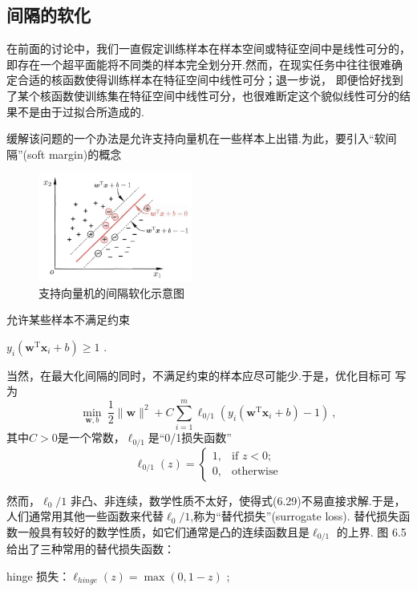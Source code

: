 \documentclass[12pt]{ctexart}
\numberwithin{equation}{section} %
\begin{document}
\subsection{间隔的软化}
在前面的讨论中，我们一直假定训练样本在样本空间或特征空间中是线性可分的，即存在一个超平面能将不同类的样本完全划分开.然而，在现实任务中往往很难确定合适的核函数使得训练样本在特征空间中线性可分；退一步说， 即便恰好找到了某个核函数使训练集在特征空间中线性可分，也很难断定这个貌似线性可分的结果不是由于过拟合所造成的.

缓解该问题的一个办法是允许支持向量机在一些样本上出错.为此，要引入“软间隔”(soft margin)的概念


\begin{figure}[h!] %
  \centering %
  \includegraphics[width=0.45\textwidth]{pi/支持向量机的间隔软化.png} %
  \caption{支持向量机的间隔软化示意图} %
  \label{fig:支持向量机的间隔软化} %
\end{figure}


允许某些样本不满足约束

$y_i( \boldsymbol{w}^\mathrm{T} \boldsymbol{x}_i+ b) \geqslant 1$ .

当然，在最大化间隔的同时，不满足约束的样本应尽可能少.于是，优化目标可
写为
$$\min_{\boldsymbol{w},b}\:\frac{1}{2}\|\boldsymbol{w}\|^2+C\sum_{i=1}^m\ell_{0/1}\left(y_i\left(\boldsymbol{w}^\mathrm{T}\boldsymbol{x}_i+b\right)-1\right)\:,$$
其中$C>0$是一个常数，$\ell_{0/1}$是“0/1损失函数”
$$\ell_{0/1}(z)=\begin{cases}1,&\text{if }z<0;\\[2ex]0,&\text{otherwise}\end{cases}$$

然而，$\ell_0/1$ 非凸、非连续，数学性质不太好，使得式(6.29)不易直接求解.于是，人们通常用其他一些函数来代替$\ell_0/1$,称为“替代损失”(surrogate loss). 替代损失函数一般具有较好的数学性质，如它们通常是凸的连续函数且是$\ell_{0/1}$ 的上界. 图 6.5 给出了三种常用的替代损失函数：

hinge 损失：$\ell _{hinge}( z) = \max ( 0, 1- z)$ ;
\end{document}
